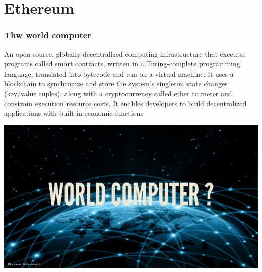 \documentclass[11pt]{beamer}  %
\begin{document}
\section{Ethereum}

\begin{frame}
  \frametitle{Thw world computer}

  \begin{greenbox}{}
    An open source, globally \alert{decentralized computing infrastructure}
    that executes programs called \alert{smart contracts}, written
    in a \alert{Turing-complete} programming language, translated into
    bytecode and run on a \alert{virtual machine}. It uses a
    \alert{blockchain} to synchronize and store the system's \alert{singleton state} changes
    (key/value tuples), along
    with a cryptocurrency called \alert{ether} to \alert{meter and constrain}
    execution resource costs. It enables developers to build
    \alert{decentralized applications} with \alert{built-in economic functions}
  \end{greenbox}

  \begin{center}
    \includegraphics[scale=0.3,clip=false]{pictures/world-computer.jpg}
  \end{center}

\end{frame}
\end{document}
